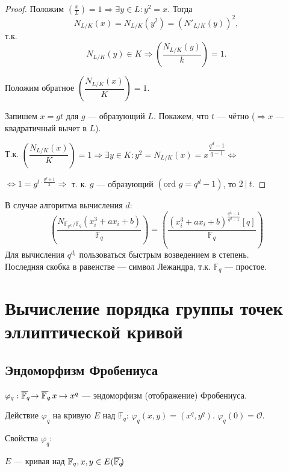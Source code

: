 \documentclass[12pt]{article}
\newcommand{\F}{{{\mathbb F}}}
\newcommand{\Fqd}{{{\F_{q^{d_i}}}}}
\newcommand{\bigO}{\mathcal{O}}
\newcommand{\overbar}[1]{\overline{\mkern-0.0mu#1\mkern-4.0mu}}
\theoremstyle{definition}
\theoremstyle{definition}
\theoremstyle{definition}
\begin{document}
\begin{proof}
    Положим $( {\frac{x}{L}} ) = 1 \Rightarrow \exists y \in L: y^2 = x.$ Тогда 
    \[
    {N_{L/K}}( x ) = {N_{L/K}}( {{y^2}} ) = {( {N'_{L/K}( y )} )^2},
    \]
    т.к. 
    \[
    N_{L/K}( y ) \in K \Rightarrow \left( {\frac{N_{L/K}( y )}{k}} \right) = 1.
    \]
    
    Положим обратное $\left( {\dfrac{{{N_{L/K}}( x )}}{K}} \right) = 1$.
    
    Запишем $x = gt$ для $g$ — образующий $L$. Покажем, что $t$ — чётно ($ \Rightarrow x $ — квадратичный вычет в $L$).
    
    Т.к. $\left( {\dfrac{N_{L/K}( x )}{K}} \right) = 1 \Rightarrow \exists y \in K: {y^2} = {N_{L/K}}( x ) = x^{\dfrac{{{q^d} - 1}}{{q - 1}}}  \Leftrightarrow $
    
    $ \Leftrightarrow 1 = {g^{t \cdot \frac{{q^d} \pm 1}{2}}} \Rightarrow $ т. к. $g$ — образующий $( {{\text{ord }} g = {q^d} - 1} )$, то $2\ |\ t$.
\end{proof}

В случае алгоритма вычисления $d$:
$$
\left( \dfrac{N_{\Fqd/\F_q} (x_i^3 + ax_i + b)}{\F_q} \right) = \left( \dfrac{(x_i^3 + ax_i + b)^{\frac{q^{d_i} - 1}{q^d - 1}} [q]}{\F_q} \right)
$$
Для вычисления $q^{d_i}$ пользоваться быстрым возведением в степень. \\
Последняя скобка в равенстве — символ Лежандра, т.к. $\F_q$ — простое.

\section{Вычисление порядка группы точек эллиптической кривой}

\subsection{Эндоморфизм Фробениуса}

${\varphi_q}: \overbar {{\F_q}}  \to \overbar {\F_q}, x \mapsto x^q $ — эндоморфизм (отображение) Фробениуса.

Действие ${\varphi _q}$ на кривую $E$ над ${\F_q}$:\; ${\varphi _q}(x, y) = (x^q, y^q)$. ${\varphi _q}( 0 ) = \bigO$. 

Свойства ${\varphi _q}:$

$E$ — кривая над ${\F_q}, x, y \in E(\overbar{\F_q})$
\end{document}
